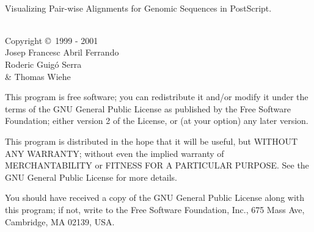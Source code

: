 %
%
%
%
%

\begin{center}
\begin{ttfamily}
\\[20pt]

\begin{flushleft}
Visualizing Pair-wise Alignments for Genomic Sequences in PostScript.
\end{flushleft}\vspace{1cm}

\\[28pt]

Copyright \copyright\ 1999 - 2001 \\
Josep Francesc Abril Ferrando{\,\footnotesize\raisebox{0.75ex}{$\dag$}} \\
Roderic Guig\'o Serra{\,\footnotesize\raisebox{0.75ex}{$\dag$}} \\
\& Thomas Wiehe{\,\footnotesize\raisebox{0.75ex}{$\ddag$}}
\vspace{15pt}

\begin{flushleft}
This program is free software; you can redistribute it and/or modify
it under the terms of the GNU General Public License as published by
the Free Software Foundation; either version 2 of the License, or
(at your option) any later version.\vspace{2.5ex}

This program is distributed in the hope that it will be useful,
but WITHOUT ANY WARRANTY; without even the implied warranty of
MERCHANTABILITY or FITNESS FOR A PARTICULAR PURPOSE.  See the
GNU General Public License for more details.\vspace{2.5ex}

You should have received a copy of the GNU General Public License
along with this program; if not, write to the Free Software
Foundation, Inc., 675 Mass Ave, Cambridge, MA 02139, USA.\vspace{20pt}


\end{flushleft}
\end{ttfamily}
\end{center}
